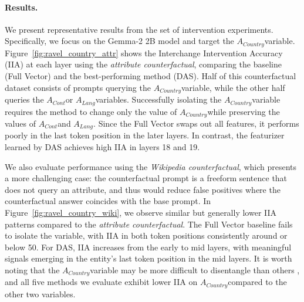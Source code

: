 \documentclass{article}
\theoremstyle{plain}
\theoremstyle{definition}
\theoremstyle{remark}
\newcommand{\continent}{$A_{\mathit{Cont}}$}
\newcommand{\country}{$A_{\mathit{Country}}$}
\newcommand{\lang}{$A_{\mathit{Lang}}$}
\begin{document}
\paragraph{Results.} We present representative results from the set of intervention experiments. Specifically, we focus on the Gemma-2 2B model and target the \country variable. Figure~\ref{fig:ravel_country_attr} shows the Interchange Intervention Accuracy (IIA) at each layer using the \textit{attribute counterfactual}, comparing the baseline (Full Vector) and the best-performing method (DAS). Half of this counterfactual dataset consists of prompts querying the \country variable, while the other half queries the \continent or \lang variables. Successfully isolating the \country variable requires the method to change only the value of \country while preserving the values of \continent and \lang. Since the Full Vector swaps out all features, it performs poorly in the last token position in the later layers. In contrast, the featurizer learned by DAS achieves high IIA in layers 18 and 19.

We also evaluate performance using the \textit{Wikipedia counterfactual}, which presents a more challenging case: the counterfactual prompt is a freeform sentence that does not query an attribute, and thus would reduce false positives where the counterfactual answer coincides with the base prompt. In Figure~\ref{fig:ravel_country_wiki}, we observe similar but generally lower IIA patterns compared to the \textit{attribute counterfactual}. The Full Vector baseline fails to isolate the variable, with IIA in both token positions consistently around or below 50. For DAS, IIA increases from the early to mid layers, with meaningful signals emerging in the entity's last token position in the mid layers. It is worth noting that the \country variable may be more difficult to disentangle than others \citep{huang-etal-2024-ravel}, and all five methods we evaluate exhibit lower IIA on \country compared to the other two variables.



\newcommand{\IOIbias}{0.048}
\newcommand{\positioncoef}{2.005}
\newcommand{\tokencoef}{0.768}
\end{document}
